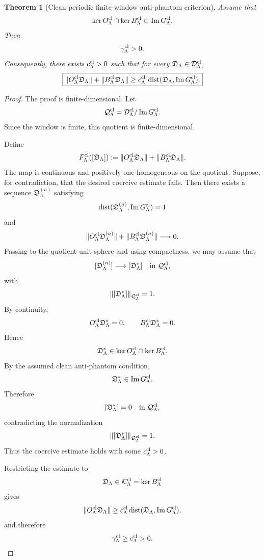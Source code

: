 \documentclass[11pt]{article}
\numberwithin{equation}{section}
\newtheorem{theorem}{Theorem}[section]
\begin{document}
\begin{theorem}[Clean periodic finite-window anti-phantom criterion]
\label{thm:clean-periodic-gap}
Assume that
\[
        \ker O_\Lambda^{\rm cl}
        \cap
        \ker B_\Lambda^{\rm cl}
        \subset
        \operatorname{Im}G_\Lambda^{\rm cl}.
\]
Then
\[
        \gamma_\Lambda^{\rm cl}>0.
\]
Consequently, there exists \(c_\Lambda^{\rm cl}>0\) such that for every
\(\mathfrak D_\Lambda\in\mathcal D_\Lambda^{\rm cl}\),
\[
\boxed{
        \|O_\Lambda^{\rm cl}\mathfrak D_\Lambda\|
        +
        \|B_\Lambda^{\rm cl}\mathfrak D_\Lambda\|
        \ge
        c_\Lambda^{\rm cl}\,
        \operatorname{dist}
        (\mathfrak D_\Lambda,\operatorname{Im}G_\Lambda^{\rm cl}) .
}
\]
\end{theorem}

\begin{proof}
The proof is finite-dimensional.  Let
\[
        \mathcal Q_\Lambda^{\rm cl}
        =
        \mathcal D_\Lambda^{\rm cl}/\operatorname{Im}G_\Lambda^{\rm cl}.
\]
Since the window is finite, this quotient is finite-dimensional.

Define
\[
        F_\Lambda^{\rm cl}([\mathfrak D_\Lambda])
        :=
        \|O_\Lambda^{\rm cl}\mathfrak D_\Lambda\|
        +
        \|B_\Lambda^{\rm cl}\mathfrak D_\Lambda\|.
\]
The map is continuous and positively one-homogeneous on the quotient.
Suppose, for contradiction, that the desired coercive estimate fails.
Then there exists a sequence \(\mathfrak D_\Lambda^{(n)}\) satisfying
\[
        \operatorname{dist}
        (\mathfrak D_\Lambda^{(n)},\operatorname{Im}G_\Lambda^{\rm cl})
        =1
\]
and
\[
        \|O_\Lambda^{\rm cl}\mathfrak D_\Lambda^{(n)}\|
        +
        \|B_\Lambda^{\rm cl}\mathfrak D_\Lambda^{(n)}\|
        \longrightarrow 0 .
\]
Passing to the quotient unit sphere and using compactness, we may assume
that
\[
        [\mathfrak D_\Lambda^{(n)}]
        \longrightarrow
        [\mathfrak D_\Lambda^\ast]
        \quad\text{in }\mathcal Q_\Lambda^{\rm cl},
\]
with
\[
        \|[\mathfrak D_\Lambda^\ast]\|_{\mathcal Q_\Lambda^{\rm cl}}=1.
\]
By continuity,
\[
        O_\Lambda^{\rm cl}\mathfrak D_\Lambda^\ast=0,
        \qquad
        B_\Lambda^{\rm cl}\mathfrak D_\Lambda^\ast=0.
\]
Hence
\[
        \mathfrak D_\Lambda^\ast
        \in
        \ker O_\Lambda^{\rm cl}
        \cap
        \ker B_\Lambda^{\rm cl}.
\]
By the assumed clean anti-phantom condition,
\[
        \mathfrak D_\Lambda^\ast
        \in
        \operatorname{Im}G_\Lambda^{\rm cl}.
\]
Therefore
\[
        [\mathfrak D_\Lambda^\ast]=0
        \quad\text{in }\mathcal Q_\Lambda^{\rm cl},
\]
contradicting the normalization
\[
        \|[\mathfrak D_\Lambda^\ast]\|_{\mathcal Q_\Lambda^{\rm cl}}=1.
\]
Thus the coercive estimate holds with some
\(c_\Lambda^{\rm cl}>0\).

Restricting the estimate to
\[
        \mathfrak D_\Lambda\in\mathcal K_\Lambda^{\rm cl}
        =
        \ker B_\Lambda^{\rm cl}
\]
gives
\[
        \|O_\Lambda^{\rm cl}\mathfrak D_\Lambda\|
        \ge
        c_\Lambda^{\rm cl}
        \operatorname{dist}
        (\mathfrak D_\Lambda,\operatorname{Im}G_\Lambda^{\rm cl}),
\]
and therefore
\[
        \gamma_\Lambda^{\rm cl}
        \ge
        c_\Lambda^{\rm cl}>0.
\]
\end{proof}
\end{document}
